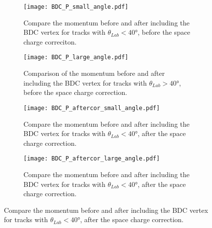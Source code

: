 \begin{figure}[!htb]
    \centering
    \begin{subfigure}[t]{0.45\textwidth}
        \centering
        \texttt{[image: BDC\_P\_small\_angle.pdf]} 
        \caption{Compare the momentum before and after including the BDC vertex for tracks with $\theta_{Lab} < \ang{40}$, before the space charge correciton.} \label{fig:mom_S_before}
    \end{subfigure}
    \hfill
    \begin{subfigure}[t]{0.45\textwidth}
        \centering
        \texttt{[image: BDC\_P\_large\_angle.pdf]} 
        \caption{Comparison of the momentum before and after including the BDC vertex for tracks with $\theta_{Lab} > \ang{40}$, before the space charge correction.} \label{fig:mom_L_before}
    \end{subfigure}
    
    \begin{subfigure}[t]{0.45\textwidth}
        \centering
        \texttt{[image: BDC\_P\_aftercor\_small\_angle.pdf]} 
        \caption{Compare the momentum before and after including the BDC vertex for tracks with $\theta_{Lab} < \ang{40}$, after the space charge correction. } \label{fig:mom_S_after}
    \end{subfigure}
    \hfill
    \begin{subfigure}[t]{0.45\textwidth}
        \centering
        \texttt{[image: BDC\_P\_aftercor\_large\_angle.pdf]} 
        \caption{Compare the momentum before and after including the BDC vertex for tracks with $\theta_{Lab} < \ang{40}$, after the space charge correction.} \label{fig:mom_L_after}
    \end{subfigure}
\label{fig:mom_sc}
\end{figure}



\begin{comment}

\begin{figure}[!htb]
    \centering
    \begin{subfigure}[t]{0.49\textwidth}
        \centering
        \texttt{[image: BDC\_P\_frac\_small\_angle.pdf]} 
        \caption{Generic} \label{fig:mom_S_1D}
    \end{subfigure}
    \hfill
    \begin{subfigure}[t]{0.49\textwidth}
        \centering
        \texttt{[image: BDC\_P\_frac\_large\_angle.pdf]} 
        \caption{Competitors} \label{fig:mom_L_1D}
    \end{subfigure}
    
\label{fig:mom_1D}
\end{figure}
\end{comment}






